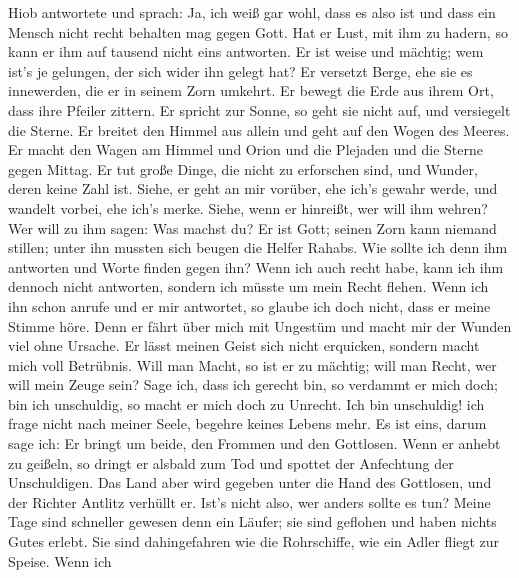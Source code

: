  Hiob antwortete und sprach:  Ja, ich weiß
gar wohl, dass es also ist und dass ein Mensch nicht recht behalten mag
gegen Gott.  Hat er Lust, mit ihm zu hadern, so kann er
ihm auf tausend nicht eins antworten.  Er ist weise und
mächtig; wem ist's je gelungen, der sich wider ihn gelegt hat?
 Er versetzt Berge, ehe sie es innewerden, die er in
seinem Zorn umkehrt.  Er bewegt die Erde aus ihrem Ort,
dass ihre Pfeiler zittern.  Er spricht zur Sonne, so geht
sie nicht auf, und versiegelt die Sterne.  Er breitet den
Himmel aus allein und geht auf den Wogen des Meeres.  Er
macht den Wagen am Himmel und Orion und die Plejaden und die Sterne
gegen Mittag.  Er tut große Dinge, die nicht zu
erforschen sind, und Wunder, deren keine Zahl ist. 
Siehe, er geht an mir vorüber, ehe ich's gewahr werde, und wandelt
vorbei, ehe ich's merke.  Siehe, wenn er hinreißt, wer
will ihm wehren? Wer will zu ihm sagen: Was machst du? 
Er ist Gott; seinen Zorn kann niemand stillen; unter ihn mussten sich
beugen die Helfer Rahabs.  Wie sollte ich denn ihm
antworten und Worte finden gegen ihn?  Wenn ich auch
recht habe, kann ich ihm dennoch nicht antworten, sondern ich müsste um
mein Recht flehen.  Wenn ich ihn schon anrufe und er mir
antwortet, so glaube ich doch nicht, dass er meine Stimme höre.
 Denn er fährt über mich mit Ungestüm und macht mir der
Wunden viel ohne Ursache.  Er lässt meinen Geist sich
nicht erquicken, sondern macht mich voll Betrübnis.  Will
man Macht, so ist er zu mächtig; will man Recht, wer will mein Zeuge
sein?  Sage ich, dass ich gerecht bin, so verdammt er
mich doch; bin ich unschuldig, so macht er mich doch zu Unrecht.
 Ich bin unschuldig! ich frage nicht nach meiner Seele,
begehre keines Lebens mehr.  Es ist eins, darum sage ich:
Er bringt um beide, den Frommen und den Gottlosen.  Wenn
er anhebt zu geißeln, so dringt er alsbald zum Tod und spottet der
Anfechtung der Unschuldigen.  Das Land aber wird gegeben
unter die Hand des Gottlosen, und der Richter Antlitz verhüllt er. Ist's
nicht also, wer anders sollte es tun?  Meine Tage sind
schneller gewesen denn ein Läufer; sie sind geflohen und haben nichts
Gutes erlebt.  Sie sind dahingefahren wie die
Rohrschiffe, wie ein Adler fliegt zur Speise.  Wenn ich
